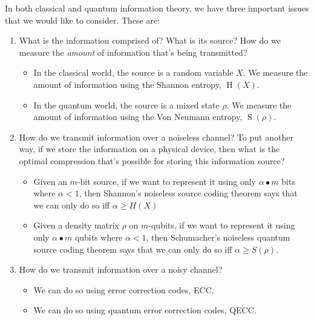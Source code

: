 \documentclass[11pt]{article}
\newcommand{\se}{\operatorname{H}}
\newcommand{\vne}{\operatorname{S}}
\def\fill{   \hfill}
\begin{document}
\noindent In both classical and quantum information theory, we have three important issues that we would like to consider. These are:
\begin{enumerate}[start=0]
\item What is the information comprised of? What is its source? How do we measure the \emph{amount} of information that's being transmitted?
	\begin{itemize}
		\item In the classical world, the source is a random variable $X$. We measure the amount of information using the Shannon entropy, $\se(X)$.
		
		\item In the quantum world, the source is a mixed state $\rho$. We measure the amount of information using the Von Neumann entropy, $\vne(\rho)$.
	\end{itemize}

\item How do we transmit information over a noiseless channel? To put another way, if we store the information on a physical device, then what is the optimal compression that's possible for storing this information source?
	\begin{itemize}
		\item Given an $m$-bit source, if we want to represent it using only $\alpha\bullet m$ bits where $\alpha < 1$, then Shannon's noiseless source coding theorem says that we can only do so iff $\alpha \geq H(X)$
		
		\item Given a density matrix $\rho$ on $m$-qubits, if we want to represent it using only $\alpha\bullet m$ qubits where $\alpha < 1$, then Schumacher's noiseless quantum source coding theorem says that we can only do so iff $\alpha \geq S(\rho)$.
	\end{itemize}

\item How do we transmit information over a noisy channel?
	\begin{itemize}
		\item We can do so using error correction codes, ECC.
		
		\item We can do so using quantum error correction codes, QECC.
	\end{itemize}
\end{enumerate}

\fill
\end{document}
